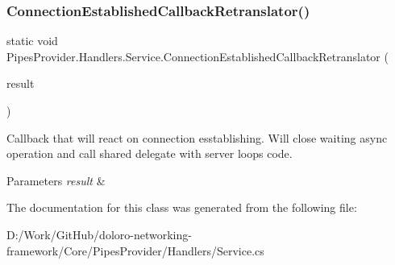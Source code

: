 \subsubsection{\texorpdfstring{Connection\+Established\+Callback\+Retranslator()}{ConnectionEstablishedCallbackRetranslator()}}
{\footnotesize\ttfamily static void Pipes\+Provider.\+Handlers.\+Service.\+Connection\+Established\+Callback\+Retranslator (\begin{DoxyParamCaption}\item[{I\+Async\+Result}]{result }\end{DoxyParamCaption})\hspace{0.3cm}{\ttfamily [static]}}



Callback that will react on connection esstablishing. Will close waiting async operation and call shared delegate with server loop\textquotesingle{}s code. 


\begin{DoxyParams}{Parameters}
{\em result} & \\
\hline
\end{DoxyParams}


The documentation for this class was generated from the following file\+:\begin{DoxyCompactItemize}
\item 
D\+:/\+Work/\+Git\+Hub/doloro-\/networking-\/framework/\+Core/\+Pipes\+Provider/\+Handlers/Service.\+cs\end{DoxyCompactItemize}
